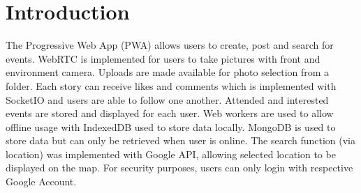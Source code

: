 \documentclass[11pt, a4paper]{article}
\begin{document}
\section{Introduction}
The Progressive Web App (PWA) allows users to create, post and search for events. WebRTC is implemented 
for users to take pictures with front and environment camera. Uploads are made available for photo selection 
from a folder. Each story can receive likes and comments which is implemented with SocketIO and users are 
able to follow one another. Attended and interested events are stored and displayed for each user. Web 
workers are used to allow offline usage with IndexedDB used to store data locally. MongoDB is used to store 
data but can only be retrieved when user is online. The search function (via location) was implemented with 
Google API, allowing selected location to be displayed on the map. For security purposes, users can only 
login with respective Google Account.
\end{document}

